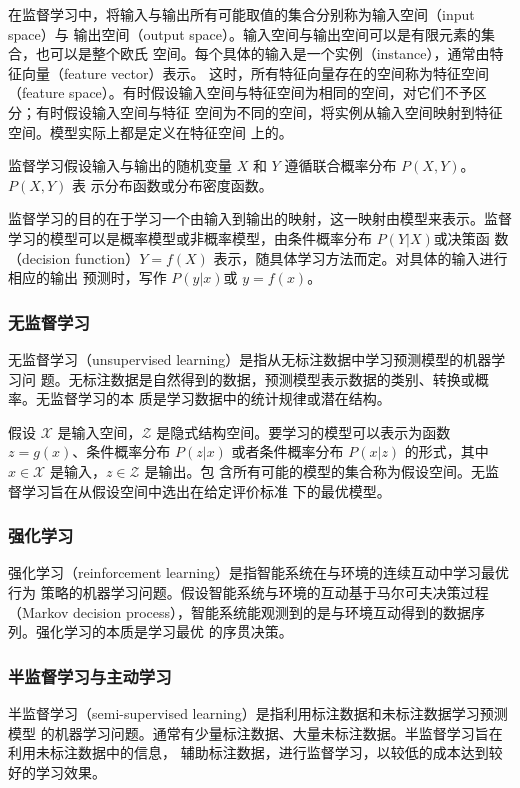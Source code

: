 在监督学习中，将输入与输出所有可能取值的集合分别称为输入空间（input space）与
输出空间（output space）。输入空间与输出空间可以是有限元素的集合，也可以是整个欧氏
空间。每个具体的输入是一个实例（instance），通常由特征向量（feature vector）表示。
这时，所有特征向量存在的空间称为特征空间（feature space）。有时假设输入空间与特征空间为相同的空间，对它们不予区分；有时假设输入空间与特征
空间为不同的空间，将实例从输入空间映射到特征空间。模型实际上都是定义在特征空间
上的。

监督学习假设输入与输出的随机变量 $X$ 和 $Y$ 遵循联合概率分布 $P(X, Y)$。$P(X, Y)$ 表
示分布函数或分布密度函数。

监督学习的目的在于学习一个由输入到输出的映射，这一映射由模型来表示。监督学习的模型可以是概率模型或非概率模型，由条件概率分布 $P(Y|X)$或决策函
数（decision function）$Y = f(X)$ 表示，随具体学习方法而定。对具体的输入进行相应的输出
预测时，写作 $P(y|x) $或 $y = f(x)$。

\subsubsection*{无监督学习}
\begin{definition}[无监督学习]
    无监督学习（unsupervised learning）是指从无标注数据中学习预测模型的机器学习问
    题。无标注数据是自然得到的数据，预测模型表示数据的类别、转换或概率。无监督学习的本
    质是学习数据中的统计规律或潜在结构。
\end{definition}

假设 $\mathcal{X}$ 是输入空间，$\mathcal{Z}$ 是隐式结构空间。要学习的模型可以表示为函数 $z = g(x)$、条件概率分布 $P(z|x)$ 或者条件概率分布 $P(x|z)$ 的形式，其中 $x \in \mathcal{X}$ 是输入，$z \in \mathcal{Z}$ 是输出。包
含所有可能的模型的集合称为假设空间。无监督学习旨在从假设空间中选出在给定评价标准
下的最优模型。

\subsubsection*{强化学习}
\begin{definition}[强化学习]
    强化学习（reinforcement learning）是指智能系统在与环境的连续互动中学习最优行为
    策略的机器学习问题。假设智能系统与环境的互动基于马尔可夫决策过程（Markov decision
    process），智能系统能观测到的是与环境互动得到的数据序列。强化学习的本质是学习最优
    的序贯决策。
\end{definition}

\subsubsection*{半监督学习与主动学习}
\begin{definition}[半监督学习]
    半监督学习（semi-supervised learning）是指利用标注数据和未标注数据学习预测模型
    的机器学习问题。通常有少量标注数据、大量未标注数据。半监督学习旨在利用未标注数据中的信息，
    辅助标注数据，进行监督学习，以较低的成本达到较好的学习效果。
\end{definition}


